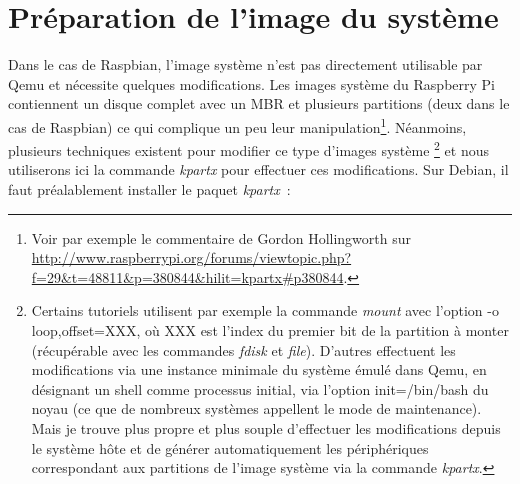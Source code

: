 \documentclass{article}
\begin{document}


\section{Préparation de l'image du système}\label{sec:setup-image}

Dans le cas de Raspbian, l'image système n'est pas directement utilisable par
Qemu et nécessite quelques modifications.
Les images système du Raspberry Pi contiennent un disque complet avec un MBR et
plusieurs partitions (deux dans le cas de Raspbian) ce qui complique un peu
leur manipulation\footnote{Voir par exemple le commentaire de Gordon
Hollingworth sur
\url{http://www.raspberrypi.org/forums/viewtopic.php?f=29&t=48811&p=380844&hilit=kpartx\#p380844}.}.
Néanmoins, plusieurs techniques existent pour modifier ce type d'images système
\footnote{
    Certains tutoriels utilisent par exemple la commande {\em mount} avec
    l'option \og{}-o loop,offset=XXX\fg{}, où XXX est l'index du premier bit de
    la partition à monter (récupérable avec les commandes {\em fdisk} et {\em
    file}).
    D'autres effectuent les modifications via une instance minimale du système
    émulé dans Qemu, en désignant un shell comme processus initial, via
    l'option \og{}init=/bin/bash\fg{} du noyau (ce que de nombreux systèmes
    appellent le \og{}mode de maintenance\fg{}).
    Mais je trouve plus propre et plus souple d'effectuer les modifications
    depuis le système hôte et de générer automatiquement les périphériques
    correspondant aux partitions de l'image système via la commande {\em
    kpartx}.

} et nous utiliserons ici la commande {\em kpartx} pour effectuer ces modifications. %
Sur Debian, il faut préalablement installer le paquet {\em kpartx}~:
\end{document}
